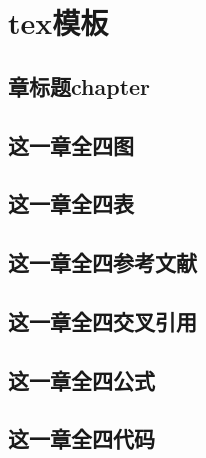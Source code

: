 \part{tex模板}
 
\chapter{章标题chapter}


\chapter{这一章全四图}


\chapter{这一章全四表}


\chapter{这一章全四参考文献}


\chapter{这一章全四交叉引用}


\chapter{这一章全四公式}


\chapter{这一章全四代码}



%
